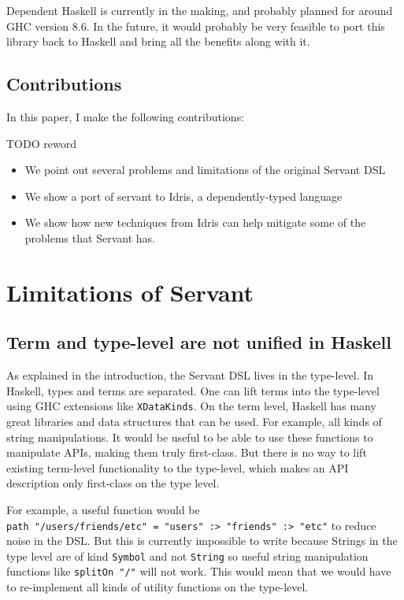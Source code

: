 \documentclass[12pt,a4paper]{article}
\begin{document}
Dependent Haskell is currently in the making, and probably planned for around GHC version 8.6. In the future, it would probably be very feasible to port this library back to Haskell and bring all the benefits along with it.

\subsection{Contributions}
In this paper, I make the following contributions:

TODO reword
\begin{itemize}
  \item We point out several problems and limitations of the original Servant DSL
  \item We show a port of servant to Idris, a dependently-typed language
  \item We show how new techniques from Idris can help mitigate some of the problems that Servant has.
\end{itemize}

\section{Limitations of Servant}\label{sec:issues}
\subsection{Term and type-level are not unified in Haskell}
As explained in the introduction, the Servant DSL lives in the type-level. In Haskell, types and terms are separated. One can lift terms into the type-level using GHC extensions like \texttt{XDataKinds}.  On the term level, Haskell has many great libraries and data structures that can be used. For example, all kinds of string manipulations. It would be useful to be able to use these functions to manipulate APIs, making them truly first-class. But there is no way to lift existing term-level functionality to the type-level, which makes an API description only first-class on the type level.

For example, a useful function would be \\ \texttt{path "/users/friends/etc" = "users" :> "friends" :> "etc"} to reduce noise in the DSL\@. But this is currently impossible to write because Strings in the type level are of kind \texttt{Symbol} and not \texttt{String} so useful string manipulation functions like \texttt{splitOn "/"} will not work. This would mean that we would have to re-implement all kinds of utility functions on the type-level.
\end{document}
